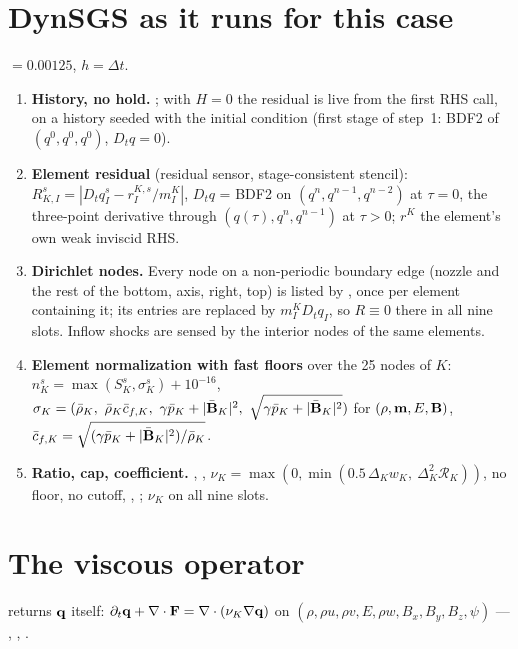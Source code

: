 \documentclass[10pt]{article}
\begin{document}
\section{DynSGS as it runs for this case}
 $=0.00125$, $h=\Delta t$.
\begin{enumerate}[leftmargin=*]
\item \textbf{History, no hold.} ; with $H=0$ the residual is live from the first RHS
call, on a history seeded with the initial condition (first stage of step~1: BDF2 of $(q^0,q^0,q^0)$, $D_tq=0$).
\item \textbf{Element residual} (residual sensor, stage-consistent stencil):
$R^s_{K,I}=|D_tq^s_I-r^{K,s}_I/m^K_I|$, $D_tq$ = BDF2 on $(q^n,q^{n-1},q^{n-2})$ at $\tau=0$, the three-point
derivative through $(q(\tau),q^n,q^{n-1})$ at $\tau>0$; $r^K$ the element's own weak inviscid RHS.
\item \textbf{Dirichlet nodes.} Every node on a non-periodic boundary edge (nozzle and the rest of the bottom,
axis, right, top) is listed by , once per element containing it; its entries are replaced by $m^K_ID_tq_I$, so
$R\equiv0$ there in all nine slots. Inflow shocks are sensed by the interior nodes of the same elements.
\item \textbf{Element normalization with fast floors} over the 25 nodes of $K$:
$n^s_K=\max(S^s_K,\sigma^s_K)+10^{-16}$, $\sigma_K=(\bar\rho_K,\ \bar\rho_K\bar c_{f,K},\ \gamma\bar p_K+|\bar{\mathbf{B}}_K|^2,\ \sqrt{\gamma\bar p_K+|\bar{\mathbf{B}}_K|^2})$
for $(\rho,\mathbf{m},E,\mathbf{B})$, $\bar c_{f,K}=\sqrt{(\gamma\bar p_K+|\bar{\mathbf{B}}_K|^2)/\bar\rho_K}$.
\item \textbf{Ratio, cap, coefficient.} ,
,
$\nu_K=\max(0,\min(0.5\,\Delta_Kw_K,\ \Delta_K^2\mathcal R_K))$, no floor, no cutoff, ,
; $\nu_K$ on all nine slots.
\end{enumerate}

\section{The viscous operator}
 returns $\mathbf{q}$ itself:
$\partial_t\mathbf{q}+\nabla\cdot\mathbf{F}=\nabla\cdot(\nu_K\nabla\mathbf{q})$ on $(\rho,\rho u,\rho v,E,\rho w,B_x,B_y,B_z,\psi)$ ---
, , .
\end{document}
